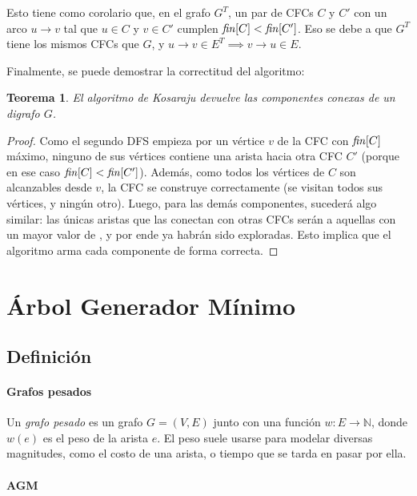 \documentclass[a4paper]{report}
\newcommand{\N}{\mathbb{N}}
\newtheorem*{theorem*}{Teorema}
\begin{document}
Esto tiene como corolario que, en el grafo $G^T$, un par de CFCs $C$ y $C'$ con un arco $u \rightarrow v$ tal que $u \in C$ y $v \in C'$ cumplen $\id{fin}[C] < \id{fin}[C']$. Eso se debe a que $G^T$ tiene los mismos CFCs que $G$, y $u \rightarrow v \in E^T \implies v \rightarrow u \in E$.

Finalmente, se puede demostrar la correctitud del algoritmo:
\begin{theorem*}
    El algoritmo de Kosaraju devuelve las componentes conexas de un digrafo $G$.
\end{theorem*}
\begin{proof}
    Como el segundo DFS empieza por un vértice $v$ de la CFC con $\id{fin}[C]$ máximo, ninguno de sus vértices contiene una arista hacia otra CFC $C'$ (porque en ese caso $\id{fin}[C] < \id{fin}[C']$). Además, como todos los vértices de $C$ son alcanzables desde $v$, la CFC se construye correctamente (se visitan todos sus vértices, y ningún otro). Luego, para las demás componentes, sucederá algo similar: las únicas aristas que las conectan con otras CFCs serán a aquellas con un mayor valor de , y por ende ya habrán sido exploradas. Esto implica que el algoritmo arma cada componente de forma correcta.

\end{proof}

\chapter{Árbol Generador Mínimo}

\section{Definición}

\subsubsection{Grafos pesados}

Un \textit{grafo pesado} es un grafo $G = (V, E)$ junto con una función $w: E \longrightarrow \N$, donde $w(e)$ es el peso de la arista $e$. El peso suele usarse para modelar diversas magnitudes, como el costo de una arista, o tiempo que se tarda en pasar por ella.


\subsubsection{AGM}
\end{document}
